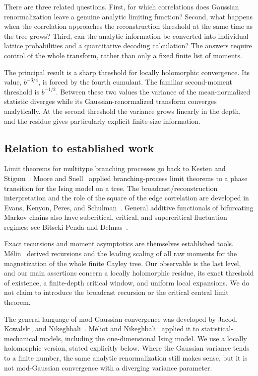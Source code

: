 \documentclass[11pt]{article}
\theoremstyle{definition}
\begin{document}
There are three related questions. First, for which correlations does
Gaussian renormalization leave a genuine analytic limiting function?
Second, what happens when the correlation approaches the reconstruction
threshold at the same time as the tree grows? Third, can the analytic
information be converted into individual lattice probabilities and a
quantitative decoding calculation? The answers require control of the
whole transform, rather than only a fixed finite list of moments.

The principal result is a sharp threshold for locally holomorphic
convergence. Its value, $b^{-3/4}$, is forced by the fourth cumulant.
The familiar second-moment threshold is $b^{-1/2}$. Between these two
values the variance of the mean-normalized statistic diverges while its
Gaussian-renormalized transform converges analytically. At the second
threshold the variance grows linearly in the depth, and the residue gives
particularly explicit finite-size information.

\subsection{Relation to established work}

Limit theorems for multitype branching processes go back to Kesten and
Stigum~\cite{KestenStigum1966}. Moore and Snell~\cite{MooreSnell1979}
applied branching-process limit theorems to a phase transition for the
Ising model on a tree. The broadcast/reconstruction interpretation and
the role of the square of the edge correlation are developed in
Evans, Kenyon, Peres, and Schulman~\cite{EKPS2000}. General additive
functionals of bifurcating Markov chains also have subcritical, critical,
and supercritical fluctuation regimes; see Bitseki Penda and
Delmas~\cite{BitsekiDelmas2021}.

Exact recursions and moment asymptotics are themselves established tools.
M\'elin~\cite{Melin1996} derived recursions and the leading scaling of
all raw moments for the magnetization of the whole finite Cayley tree.
Our observable is the last level, and our main assertions concern a
locally holomorphic residue, its exact threshold of existence, a
finite-depth critical window, and uniform local expansions. We do not
claim to introduce the broadcast recursion or the critical central limit
theorem.

The general language of mod-Gaussian convergence was developed by
Jacod, Kowalski, and Nikeghbali~\cite{JKN2011}. M\'eliot and
Nikeghbali~\cite{MeliotNikeghbali2014} applied it to statistical-mechanical
models, including the one-dimensional Ising model. We use a locally
holomorphic version, stated explicitly below. Where the Gaussian
variance tends to a finite number, the same analytic renormalization
still makes sense, but it is not mod-Gaussian convergence with a
diverging variance parameter.
\end{document}
